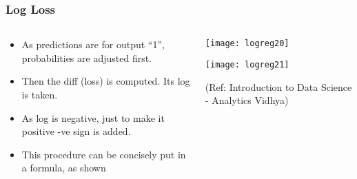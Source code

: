 \begin{frame}[fragile]\frametitle{Log Loss}

\begin{columns}
\begin{column}[T]{0.5\linewidth}
\begin{itemize}
\item As predictions are for output ``1'', probabilities are adjusted first.
\item Then the diff (loss) is computed. Its log is taken.
\item As log is negative, just to make it positive -ve sign is added.
\item This procedure can be concisely put in a formula, as shown
\end{itemize}
\end{column}
\begin{column}[T]{0.5\linewidth}

\begin{center}
\texttt{[image: logreg20]}

\texttt{[image: logreg21]}

\end{center}

{\tiny (Ref: Introduction to Data Science - Analytics Vidhya)}
\end{column}

\end{columns}
\end{frame}





